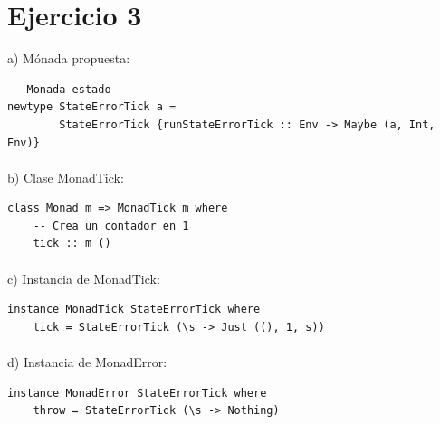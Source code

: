 \documentclass{article}
\begin{document}
\newpage
\section*{Ejercicio 3}
a) Mónada propuesta: 
\begin{lstlisting}
-- Monada estado
newtype StateErrorTick a = 
        StateErrorTick {runStateErrorTick :: Env -> Maybe (a, Int, Env)}
\end{lstlisting}
\paragraph{}
b) Clase MonadTick: 
\begin{lstlisting}
class Monad m => MonadTick m where
    -- Crea un contador en 1
    tick :: m ()
\end{lstlisting}
\paragraph{}
c) Instancia de MonadTick:  
\begin{lstlisting}
instance MonadTick StateErrorTick where
    tick = StateErrorTick (\s -> Just ((), 1, s))
\end{lstlisting}
\paragraph{}
d) Instancia de MonadError: 
\begin{lstlisting}
instance MonadError StateErrorTick where
    throw = StateErrorTick (\s -> Nothing)
\end{lstlisting}
\end{document}
